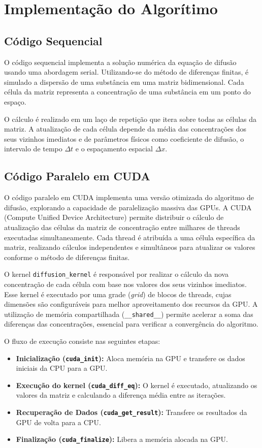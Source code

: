 \documentclass[12pt]{article}
\begin{document}
\section{Implementação do Algorítimo}

\subsection{Código Sequencial}

O código sequencial implementa a solução numérica da equação de difusão usando
uma abordagem serial. Utilizando-se do método de diferenças finitas, é simulado
a dispersão de uma substância em uma matriz bidimensional. Cada célula da
matriz representa a concentração de uma substância em um ponto do espaço.

O cálculo é realizado em um laço de repetição que itera sobre todas as células
da matriz. A atualização de cada célula depende da média das concentrações dos
seus vizinhos imediatos e de parâmetros físicos como coeficiente de difusão, o
intervalo de tempo $\Delta t$ e o espaçamento espacial $\Delta x$.

\subsection{Código Paralelo em CUDA}

O código paralelo em CUDA implementa uma versão otimizada do algoritmo de
difusão, explorando a capacidade de paralelização massiva das GPUs. A CUDA
(Compute Unified Device Architecture) permite distribuir o cálculo de
atualização das células da matriz de concentração entre milhares de threads
executadas simultaneamente. Cada thread é atribuída a uma célula específica da
matriz, realizando cálculos independentes e simultâneos para atualizar os
valores conforme o método de diferenças finitas.

O kernel \texttt{diffusion\_kernel} é responsável por realizar o cálculo da
nova concentração de cada célula com base nos valores dos seus vizinhos
imediatos. Esse kernel é executado por uma grade (\textit{grid}) de blocos de
threads, cujas dimensões são configuráveis para melhor aproveitamento dos
recursos da GPU\@. A utilização de memória compartilhada
(\texttt{\_\_shared\_\_}) permite acelerar a soma das diferenças das
concentrações, essencial para verificar a convergência do algoritmo.

O fluxo de execução consiste nas seguintes etapas:

\begin{itemize}
  \item \textbf{Inicialização (\texttt{cuda\_init}):} Aloca memória na GPU e transfere os dados iniciais da CPU para a GPU\@.
  \item \textbf{Execução do kernel (\texttt{cuda\_diff\_eq}):} O kernel é executado, atualizando os valores da matriz e calculando a diferença média entre as iterações.
  \item \textbf{Recuperação de Dados (\texttt{cuda\_get\_result}):} Transfere os resultados da GPU de volta para a CPU\@.
  \item \textbf{Finalização (\texttt{cuda\_finalize}):} Libera a memória alocada na GPU\@.
\end{itemize}
\end{document}
